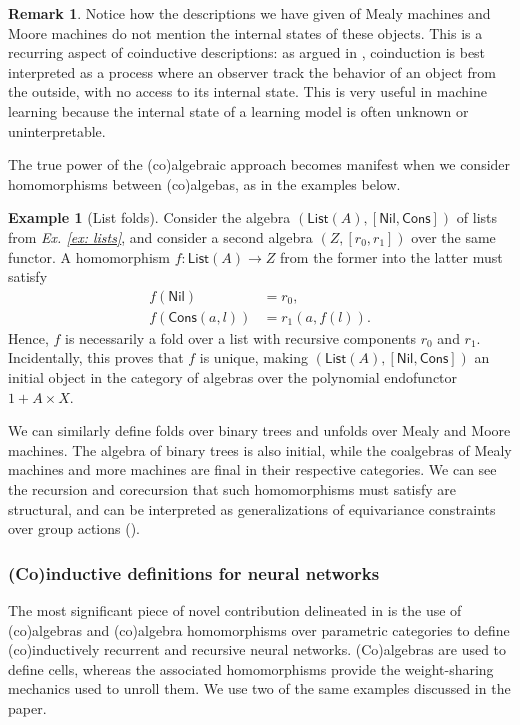 \documentclass[12pt,a4paper,openright,twoside]{report}
\theoremstyle{plain}
\theoremstyle{definition}
\newtheorem{remark}[proposition]{Remark}
\newtheorem{example}[proposition]{Example}
\begin{document}
\begin{remark}
  Notice how the descriptions we have given of Mealy machines and Moore machines do not mention the internal states of these objects. This is a recurring aspect of coinductive descriptions: as argued in \cite{jacobs1997tutorial}, coinduction is best interpreted as a process where an observer track the behavior of an object from the outside, with no access to its internal state. This is very useful in machine learning because the internal state of a learning model is often unknown or uninterpretable.
\end{remark}

The true power of the (co)algebraic approach becomes manifest when we consider homomorphisms between (co)algebas, as in the examples below.

\begin{example}[List folds]
  Consider the algebra $(\mathsf{List}(A), [\mathsf{Nil}, \mathsf{Cons}])$ of lists from \textit{Ex. \ref{ex: lists}}, and consider a second algebra $(Z, [r_0,r_1])$ over the same functor. A homomorphism $f: \mathsf{List}(A) \to Z$ from the former into the latter must satisfy 
  \begin{align*}
    f(\mathsf{Nil}) &= r_0,\\
    f(\mathsf{Cons}(a,l)) &= r_1(a,f(l)). 
  \end{align*}
  Hence, $f$ is necessarily a fold over a list with recursive components $r_0$ and $r_1$. Incidentally, this proves that $f$ is unique, making $(\mathsf{List}(A), [\mathsf{Nil}, \mathsf{Cons}])$ an initial object in the category of algebras over the polynomial endofunctor $1 + A \times X$.
\end{example}

We can similarly define folds over binary trees and unfolds over Mealy and Moore machines. The algebra of binary trees is also initial, while the coalgebras of Mealy machines and more machines are final in their respective categories. We can see the recursion and corecursion that such homomorphisms must satisfy are structural, and can be interpreted as generalizations of equivariance constraints over group actions (\cite{gavranovicposition}).


\subsubsection{(Co)inductive definitions for neural networks}

The most significant piece of novel contribution delineated in \cite{gavranovicposition} is the use of (co)algebras and (co)algebra homomorphisms over parametric categories to define (co)inductively recurrent and recursive neural networks. (Co)algebras are used to define cells, whereas the associated homomorphisms provide the weight-sharing mechanics used to unroll them. We use two of the same examples discussed in the paper.
\end{document}
